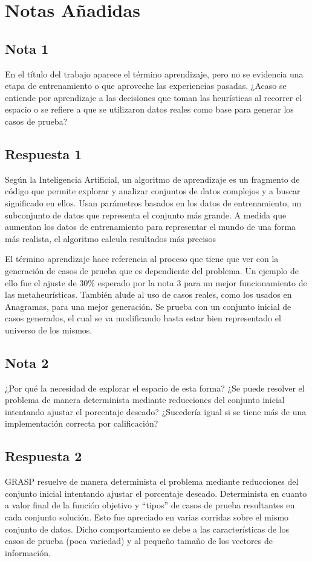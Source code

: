 \documentclass[a4paper,11pt]{article}
\begin{document}
		\section*{Notas Añadidas}
		
		\subsection*{Nota 1}
		En el título del trabajo aparece el término aprendizaje, pero no se evidencia una etapa de entrenamiento o que aproveche las experiencias pasadas. ¿Acaso se entiende por aprendizaje a las decisiones que toman las heurísticas al recorrer el espacio o se refiere a que se utilizaron datos reales como base para generar los casos de prueba?
		
		\subsection*{Respuesta 1}
		Según la Inteligencia Artificial, un algoritmo de aprendizaje es un fragmento de código que permite explorar y analizar conjuntos de datos complejos y a buscar significado en ellos. Usan parámetros basados en los datos de entrenamiento, un subconjunto de datos que representa el conjunto más grande. A medida que aumentan los datos de entrenamiento para representar el mundo de una forma más realista, el algoritmo calcula resultados más precisos \cite{aprendizaje}
		
		El término aprendizaje hace referencia al proceso que tiene que ver con la generación de casos de prueba que es dependiente del problema. Un ejemplo de ello fue el ajuste de 30\% esperado por la nota 3 para un mejor funcionamiento de las metaheurísticas. También alude al uso de casos reales, como los usados en Anagramas, para una mejor generación. Se prueba con un conjunto inicial de casos generados, el cual se va modificando hasta estar bien representado el universo de los mismos.
		
		\subsection*{Nota 2}
		¿Por qué la necesidad de explorar el espacio de esta forma? ¿Se puede resolver el problema de manera determinista mediante reducciones del conjunto inicial intentando ajustar el porcentaje deseado? ¿Sucedería igual si se tiene más de una implementación correcta por calificación?
	
		\subsection*{Respuesta 2}
		GRASP resuelve de manera determinista el problema mediante reducciones del conjunto inicial intentando ajustar el porcentaje deseado. Determinista en cuanto a valor final de la función objetivo y “tipos” de casos de prueba resultantes en cada conjunto solución. Esto fue apreciado en varias corridas sobre el mismo conjunto de datos. Dicho comportamiento se debe a las características de los casos de prueba (poca variedad) y al pequeño tamaño de los vectores de información.
		
\end{document}
